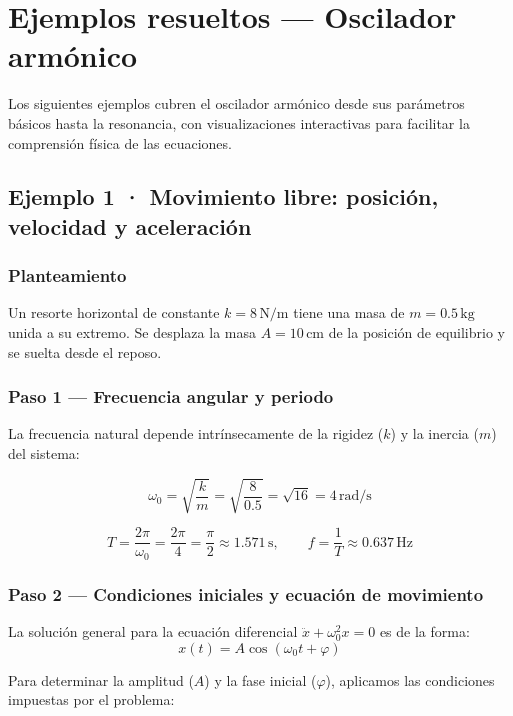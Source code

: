 \documentclass[
  letterpaper,
  DIV=11,
  numbers=noendperiod]{scrreprt}
\begin{document}
\chapter{Ejemplos resueltos --- Oscilador
armónico}\label{sec-osc-resueltos}

Los siguientes ejemplos cubren el oscilador armónico desde sus
parámetros básicos hasta la resonancia, con visualizaciones interactivas
para facilitar la comprensión física de las ecuaciones.

\section{Ejemplo 1 · Movimiento libre: posición, velocidad y
aceleración}\label{sec-osc-1}

\subsection{Planteamiento}\label{planteamiento}

Un resorte horizontal de constante \(k = 8\,\text{N/m}\) tiene una masa
de \(m = 0.5\,\text{kg}\) unida a su extremo. Se desplaza la masa
\(A = 10\,\text{cm}\) de la posición de equilibrio y se suelta desde el
reposo.

\subsection{Paso 1 --- Frecuencia angular y
periodo}\label{paso-1-frecuencia-angular-y-periodo}

La frecuencia natural depende intrínsecamente de la rigidez (\(k\)) y la
inercia (\(m\)) del sistema:

\[
\omega_0 = \sqrt{\frac{k}{m}} = \sqrt{\frac{8}{0.5}} = \sqrt{16} = 4\,\text{rad/s}
\]

\[
T = \frac{2\pi}{\omega_0} = \frac{2\pi}{4} = \frac{\pi}{2} \approx 1.571\,\text{s}, \qquad
f = \frac{1}{T} \approx 0.637\,\text{Hz}
\]

\subsection{Paso 2 --- Condiciones iniciales y ecuación de
movimiento}\label{paso-2-condiciones-iniciales-y-ecuaciuxf3n-de-movimiento}

La solución general para la ecuación diferencial
\(\ddot{x} + \omega_0^2 x = 0\) es de la forma:
\[x(t) = A\cos(\omega_0 t + \varphi)\]

Para determinar la amplitud (\(A\)) y la fase inicial (\(\varphi\)),
aplicamos las condiciones impuestas por el problema:
\end{document}
